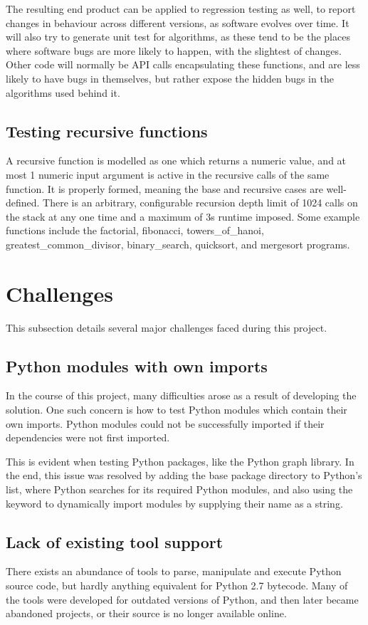 \documentclass{icldt}
\numberwithin{equation}{section}       %
\begin{document}
{{The resulting end product can be applied to regression testing as well, to report changes in behaviour across different versions, as software evolves over time. It will also try to generate unit test for algorithms, as these tend to be the places where software bugs are more likely to happen, with the slightest of changes. Other code will normally be API calls encapsulating these functions, and are less likely to have bugs in themselves, but rather expose the hidden bugs in the algorithms used behind it.

\subsection{Testing recursive functions}
A recursive function is modelled as one which returns a numeric value, and at most 1 numeric input argument is active in the recursive calls of the same function. It is properly formed, meaning the base and recursive cases are well-defined. There is an arbitrary, configurable recursion depth limit of 1024 calls on the stack at any one time and a maximum of 3s runtime imposed. Some example functions include the \textsf{factorial}, \textsf{fibonacci}, \textsf{towers_of_hanoi}, \textsf{greatest_common_divisor}, \textsf{binary_search}, \textsf{quicksort}, and \textsf{mergesort} programs.

\section{Challenges}
This subsection details several major challenges faced during this project.

\subsection{Python modules with own imports}
In the course of this project, many difficulties arose as a result of developing the solution. One such concern is how to test Python modules which contain their own imports. Python modules could not be successfully imported if their dependencies were not first imported.

This is evident when testing Python packages, like the Python graph library. In the end, this issue was resolved by adding the base package directory to Python's  list, where Python searches for its required Python modules, and also using the  keyword to dynamically import modules by supplying their name as a string.

\subsection{Lack of existing tool support}
There exists an abundance of tools to parse, manipulate and execute Python source code, but hardly anything equivalent for Python 2.7 bytecode. Many of the tools were developed for outdated versions of Python, and then later became abandoned projects, or their source is no longer available online.

}}
\end{document}

